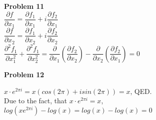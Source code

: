\documentclass[12pt]{article}
\begin{document}
    \textbf{Problem 11}\\
    $\dfrac{\partial f}{\partial x_1} = \dfrac{\partial f_1}{\partial x_1} + i \dfrac{\partial f_2}{\partial x_1}$\\
    $\dfrac{\partial f}{\partial x_2} = \dfrac{\partial f_1}{\partial x_2} + i \dfrac{\partial f_2}{\partial x_2}$\\
    $\dfrac{\partial^2 f_1}{\partial x_1^2} + \dfrac{\partial^2 f_1}{\partial x_2^2}  = \dfrac{\partial}{\partial x_1} \left( \dfrac{\partial f_2}{\partial x_2} \right) - \dfrac{\partial}{\partial x_2} \left( \dfrac{\partial f_2}{\partial x_1} \right) = 0 $
    
    \textbf{Problem 12}
    
    $x\cdot e^{2\pi i} = x (cos(2\pi) + i sin(2 \pi)) = x$, QED.\\
    Due to the fact, that $x\cdot e^{2\pi i} = x$, $log(x e^{2\pi i }) - log(x) = log(x) - log(x) = 0$
\end{document}
